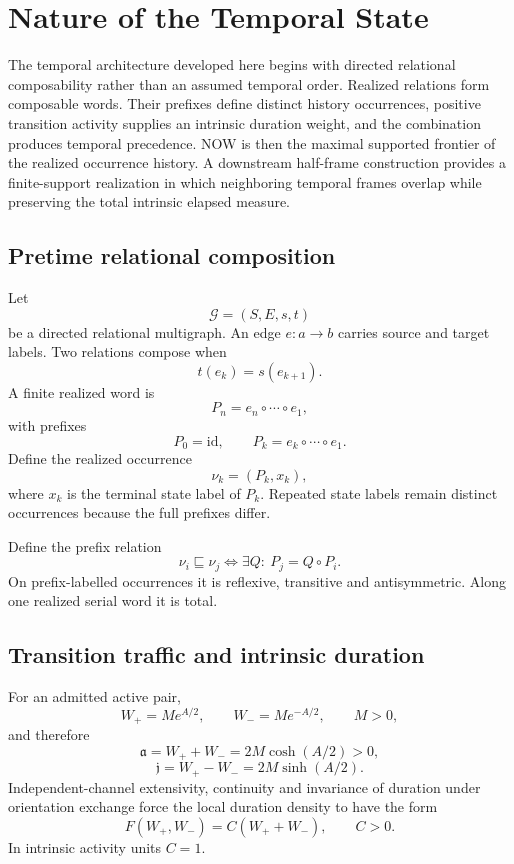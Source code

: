 \documentclass[11pt]{book}
\begin{document}
\chapter{Nature of the Temporal State}

The temporal architecture developed here begins with directed relational composability rather than an assumed temporal order. Realized relations form composable words. Their prefixes define distinct history occurrences, positive transition activity supplies an intrinsic duration weight, and the combination produces temporal precedence. NOW is then the maximal supported frontier of the realized occurrence history. A downstream half-frame construction provides a finite-support realization in which neighboring temporal frames overlap while preserving the total intrinsic elapsed measure.

\section{Pretime relational composition}

Let
\[
\mathcal G=(S,E,s,t)
\]
be a directed relational multigraph. An edge $e:a\to b$ carries source and target labels. Two relations compose when
\[
\boxed{t(e_k)=s(e_{k+1}).}
\]
A finite realized word is
\[
\boxed{
P_n=e_n\circ\cdots\circ e_1,
}
\]
with prefixes
\[
P_0=\mathrm{id},
\qquad
P_k=e_k\circ\cdots\circ e_1.
\]
Define the realized occurrence
\[
\boxed{\nu_k=(P_k,x_k),}
\]
where $x_k$ is the terminal state label of $P_k$. Repeated state labels remain distinct occurrences because the full prefixes differ.

Define the prefix relation
\[
\boxed{
\nu_i\sqsubseteq\nu_j
\iff
\exists Q:\ P_j=Q\circ P_i.
}
\]
On prefix-labelled occurrences it is reflexive, transitive and antisymmetric. Along one realized serial word it is total.

\section{Transition traffic and intrinsic duration}

For an admitted active pair,
\[
W_+=Me^{A/2},
\qquad
W_-=Me^{-A/2},
\qquad M>0,
\]
and therefore
\[
\boxed{\mathfrak a=W_++W_-=2M\cosh(A/2)>0,}
\]
\[
\boxed{\mathfrak j=W_+-W_-=2M\sinh(A/2).}
\]
Independent-channel extensivity, continuity and invariance of duration under orientation exchange force the local duration density to have the form
\[
F(W_+,W_-)=C(W_++W_-),
\qquad C>0.
\]
In intrinsic activity units $C=1$.
\end{document}
